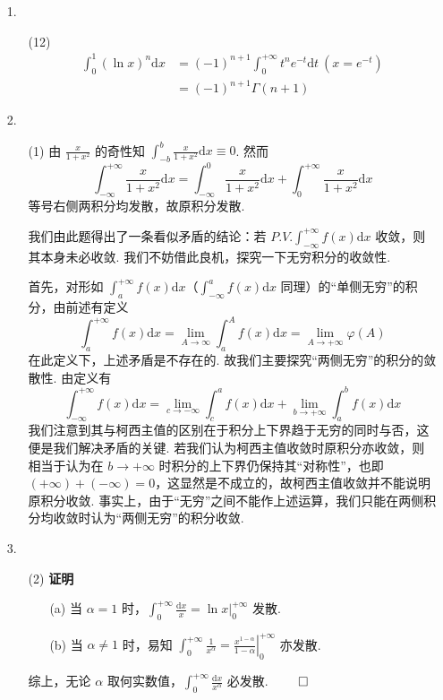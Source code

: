 \documentclass[11pt,oneside,fontset=fandol]{ctexbook} %
\begin{document}
\begin{enumerate}
    \item[1.]
    \begin{enumerate}
        \item[(12)]
        \begin{align*}
            \int_0^1 (\ln x)^n \mathrm dx &= (-1)^{n+1} \int_0^{+\infty} t^n e^{-t} \mathrm dt \ (x = e^{-t}) \\
            &= (-1)^{n+1}\Gamma(n+1)
        \end{align*}
    \end{enumerate}
    \item[2.]
    \begin{enumerate}
        \item[(1)]
        由 $\frac x {1+x^2}$ 的奇性知 $\int_{-b}^b \frac x {1+x^2} \mathrm dx \equiv 0$. 然而
        \[
            \int_{-\infty}^{+\infty} \frac x {1+x^2} \mathrm dx = \int_{-\infty}^0 \frac x {1+x^2} \mathrm dx + \int_0^{+\infty} \frac x {1+x^2} \mathrm dx
        \]
        等号右侧两积分均发散，故原积分发散.

        我们由此题得出了一条看似矛盾的结论：若 $P.V. \int_{-\infty}^{+\infty} f(x) \mathrm dx$ 收敛，则其本身未必收敛. 我们不妨借此良机，探究一下无穷积分的收敛性.

        首先，对形如 $\int_a^{+\infty} f(x) \mathrm dx$（$\int_{-\infty}^a f(x) \mathrm dx$ 同理）的“单侧无穷”的积分，由前述有定义
        \[
            \int_a^{+\infty} f(x) \mathrm dx = \lim_{A \to \infty} \int_a^A f(x) \mathrm dx = \lim_{A \to +\infty} \varphi(A)
        \]
        在此定义下，上述矛盾是不存在的. 故我们主要探究“两侧无穷”的积分的敛散性. 由定义有
        \[
            \int_{-\infty}^{+\infty} f(x) \mathrm dx = \lim_{c \to -\infty} \int_c^a f(x) \mathrm dx + \lim_{b \to +\infty} \int_a^b f(x) \mathrm dx
        \]
        我们注意到其与柯西主值的区别在于积分上下界趋于无穷的同时与否，这便是我们解决矛盾的关键. 若我们认为柯西主值收敛时原积分亦收敛，则相当于认为在 $b \to +\infty$ 时积分的上下界仍保持其“对称性”，也即 $(+\infty) + (-\infty) = 0$，这显然是不成立的，故柯西主值收敛并不能说明原积分收敛. 事实上，由于“无穷”之间不能作上述运算，我们只能在两侧积分均收敛时认为“两侧无穷”的积分收敛.
    \end{enumerate}
    \item[3.]
    \begin{enumerate}
        \item[(2)]
        \textbf{证明}
        \begin{enumerate}
            \item[(a)]
            当 $\alpha = 1$ 时，$\int_0^{+\infty} \frac {\mathrm dx} x = \ln x \bigg|_0^{+\infty}$ 发散.
            \item[(b)]
            当 $\alpha \neq 1$ 时，易知 $\int_0^{+\infty} \frac 1 {x^\alpha} = \left. \frac{x^{1-\alpha}}{1-\alpha} \right|_0^{+\infty}$ 亦发散.
        \end{enumerate}
        综上，无论 $\alpha$ 取何实数值，$\int_0^{+\infty} \frac{\mathrm dx}{x^{\alpha}} $ 必发散.
        $\hfill\qed$
    \end{enumerate}
\end{enumerate}
\end{document}
